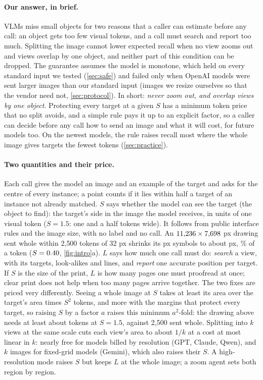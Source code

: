 \paragraph{Our answer, in brief.}
VLMs miss small objects for two reasons that a caller can estimate before any call: an object gets too few visual tokens, and a call must search and report too much. Splitting the image cannot lower expected recall when no view zooms out and views overlap by one object, and neither part of this condition can be dropped. The guarantee assumes the model is monotone, which held on every standard input we tested (\cref{sec:safe}) and failed only when OpenAI models were sent larger images than our standard input (images we resize ourselves so that the vendor need not, \cref{sec:protocol}). In short: \emph{never zoom out, and overlap views by one object}. Protecting every target at a given $S$ has a minimum token price that no split avoids, and a simple rule pays it up to an explicit factor, so a caller can decide before any call how to send an image and what it will cost, for future models too. On the newest models, the rule raises recall most where the whole image gives targets the fewest tokens (\cref{sec:practice}).

\paragraph{Two quantities and their price.}
Each call gives the model an image and an example of the target and asks for the centre of every instance; a point counts if it lies within half a target of an instance not already matched. $S$ says whether the model can see the target (the object to find): the target's side in the image the model receives, in units of one visual token ($S = 1.5$: one and a half tokens wide). It follows from public interface rules and the image size, with no label and no call. An $11{,}236{} \times 7{,}698$ px drawing sent whole within 2{,}500 tokens of 32 px shrinks its \CfigM{} px symbols to about \CfigMsent{} px, \CfigPctToken\% of a token ($S = 0.40$, \cref{fig:intro}a). $L$ says how much one call must do: \emph{search} a view, with its targets, look-alikes and lines, and \emph{report} one accurate position per target. If $S$ is the size of the print, $L$ is how many pages one must proofread at once; clear print does not help when too many pages arrive together.
The two fixes are priced very differently. Seeing a whole image at $S$ takes at least its area over the target's area times $S^2$ tokens, and more with the margins that protect every target, so raising $S$ by a factor $a$ raises this minimum $a^2$-fold: the drawing above needs at least about \CfigCmin{} tokens at $S = 1.5$, against 2{,}500 sent whole. Splitting into $k$ views at the same scale cuts each view's area to about $1/k$ at a cost at most linear in $k$: nearly free for models billed by resolution (GPT, Claude, Qwen), and $k$ images for fixed-grid models (Gemini), which also raises their $S$. A high-resolution mode raises $S$ but keeps $L$ at the whole image; a zoom agent sets both region by region.

